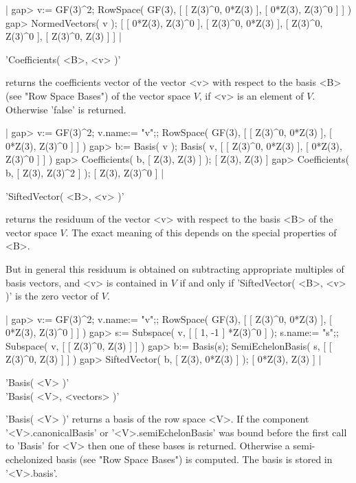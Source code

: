 |    gap> v:= GF(3)^2;
    RowSpace( GF(3), [ [ Z(3)^0, 0*Z(3) ], [ 0*Z(3), Z(3)^0 ] ] )
    gap> NormedVectors( v );
    [ [ 0*Z(3), Z(3)^0 ], [ Z(3)^0, 0*Z(3) ], [ Z(3)^0, Z(3)^0 ], 
      [ Z(3)^0, Z(3) ] ] |


'Coefficients( <B>, <v> )'

returns the coefficients vector of the vector <v> with respect to the
basis <B> (see "Row Space Bases") of the vector space $V$,
if <v> is an element of $V$.  Otherwise 'false' is returned.

|    gap> v:= GF(3)^2; v.name:= "v";;
    RowSpace( GF(3), [ [ Z(3)^0, 0*Z(3) ], [ 0*Z(3), Z(3)^0 ] ] )
    gap> b:= Basis( v );
    Basis( v, [ [ Z(3)^0, 0*Z(3) ], [ 0*Z(3), Z(3)^0 ] ] )
    gap> Coefficients( b, [ Z(3), Z(3) ] );
    [ Z(3), Z(3) ]
    gap> Coefficients( b, [ Z(3), Z(3)^2 ] );
    [ Z(3), Z(3)^0 ] |


'SiftedVector( <B>, <v> )'

returns the residuum of the vector <v> with respect to the basis <B> of
the vector space $V$.  The exact meaning of this depends on the special
properties of <B>.

But in general this residuum is obtained on subtracting appropriate
multiples of basis vectors, and <v> is contained in $V$ if and only if
'SiftedVector( <B>, <v> )' is the zero vector of $V$.

|    gap> v:= GF(3)^2; v.name:= "v";;
    RowSpace( GF(3), [ [ Z(3)^0, 0*Z(3) ], [ 0*Z(3), Z(3)^0 ] ] )
    gap> s:= Subspace( v, [ [ 1, -1 ] *Z(3)^0 ] ); s.name:= "s";;
    Subspace( v, [ [ Z(3)^0, Z(3) ] ] )
    gap> b:= Basis(s);
    SemiEchelonBasis( s, [ [ Z(3)^0, Z(3) ] ] )
    gap> SiftedVector( b, [ Z(3), 0*Z(3) ] );
    [ 0*Z(3), Z(3) ] |


'Basis( <V> )' \\
'Basis( <V>, <vectors> )'

'Basis( <V> )' returns a basis of the row space <V>.  If the component
'<V>.canonicalBasis' or '<V>.semiEchelonBasis' was bound before the first
call to 'Basis' for <V> then one of these bases is returned.  Otherwise a
semi-echelonized basis (see "Row Space Bases") is computed.
The basis is stored in '<V>.basis'.

